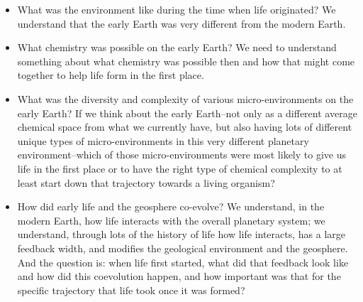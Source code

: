 \documentclass[]{article}
\begin{document}
\begin{itemize}
	\item What was the environment like during the time when life originated?
	We understand that the early Earth was 	very different from the modern Earth.
	\item What chemistry was possible on the early Earth? We need to understand something about what chemistry was possible then and how that might come together to help 	life form in the first place.
	\item What was the diversity and complexity of various micro-environments on the early Earth? If we think about the early Earth--not only as a different average chemical space from what we currently have, but	also having lots of different unique types of micro-environments in this very different planetary environment--which of those micro-environments were most likely to give us life in the first place or to have the right type of chemical complexity 	to at least start down that trajectory towards a living organism?
	
	\item How did early life and the geosphere co-evolve? 
	We understand, in the modern Earth, how life interacts with the overall planetary	system; we understand, through lots of the history of life how life interacts, has a large feedback width, and modifies	the geological environment and the geosphere. And the question is: when life first started, what did	that feedback look like and how did this coevolution happen, and how important was that for the	specific trajectory that life took once it was formed?
\end{itemize}
\end{document}
